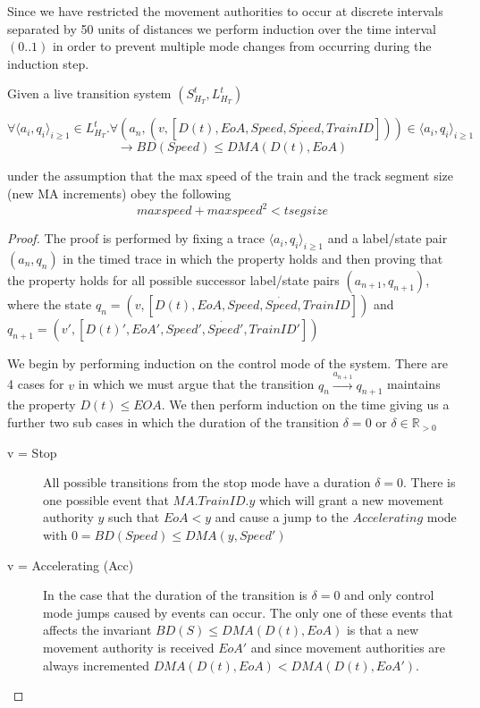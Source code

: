 Since we have restricted the movement authorities to occur at discrete intervals separated by 50 units of distances we perform induction over the time interval $(0..1)$ in order to prevent multiple mode changes from occurring during the induction step. 
\medskip
\begin{mytheorem}
Given a live transition system $(S^t_{H_{T}},  L^{t}_{H_T}) $

 $$\forall \langle a_i, q_i \rangle_{i \geq 1} \in L^{t}_{H_T}.  \forall (a_n, (v, [D(t), EoA,Speed,\dot{Speed},TrainID])) \in \langle a_i, q_i \rangle_{i \geq 1}$$ $$ \to BD(Speed) \leq DMA(D(t), EoA)$$ 

under the assumption that the max speed of the train and the track segment size (new MA increments) obey the following
                     $$maxspeed + maxspeed^2 < tsegsize$$
\begin{proof}


The proof is performed by fixing a trace $ \langle a_i, q_i \rangle_{i \geq 1}$ and  a label/state pair $(a_n, q_n)$ in the timed trace in which the property holds and then proving that the property holds for all possible successor label/state pairs $(a_{n+1},q_{n+1})$, where  the state $q_n = (v, [D(t), EoA,Speed,\dot{Speed},TrainID])$ and $q_{n+1} = (v', [D(t)', EoA',Speed',\dot{Speed}',TrainID'])$ 

We begin by performing induction on the control mode of the system. 
There are 4 cases for $v$ in which we must argue that the transition $q_n \xrightarrow{a_{n+1}} q_{n+1}$  maintains the property $D(t) \leq EOA$. We then perform induction on the time giving us a further two sub
cases in which the duration of the transition  $\delta = 0$ or $\delta \in \mathbb{R}_{>0}$



\begin{description}
\item[v = Stop] All possible transitions from the stop mode have a duration $\delta = 0$. There is one possible event that $MA.TrainID.y$ which will grant a new movement authority $y$ such that $EoA < y$ and cause a jump to the $Accelerating$ mode with $0 = BD(Speed) \leq  DMA(y,Speed') $


\item[v = Accelerating (Acc)] In the case that the duration of the transition is $\delta = 0$ and only control mode jumps caused by events can occur. The only one of these events that affects the invariant $BD(S) \leq DMA(D(t), EoA)$ is that a new movement authority is received $EoA'$ and since movement authorities are always incremented $DMA(D(t), EoA) < DMA(D(t), EoA')$.
  

\end{description}
\end{proof}
\end{mytheorem}
